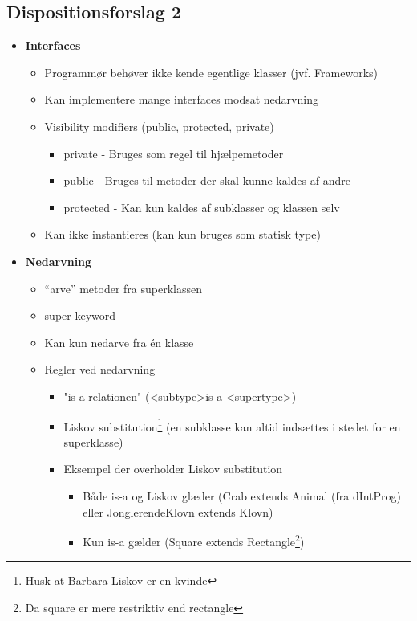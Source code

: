 \subsection{Dispositionsforslag 2}

\begin{itemize}
    \item \textbf{Interfaces}
    \begin{itemize}
        \item Programmør behøver ikke kende egentlige klasser (jvf. Frameworks)
        \item Kan implementere mange interfaces modsat nedarvning
        \item Visibility modifiers (public, protected, private)
        \begin{itemize}
            \item private - Bruges som regel til hjælpemetoder
            \item public - Bruges til metoder der skal kunne kaldes af andre
            \item protected - Kan kun kaldes af subklasser og klassen selv
        \end{itemize}

        \item Kan ikke instantieres (kan kun bruges som statisk type)
    \end{itemize}
    
    \item \textbf{Nedarvning}
    \begin{itemize}
        \item “arve” metoder fra superklassen
        \item super keyword
        \item Kan kun nedarve fra én klasse
        \item Regler ved nedarvning
        \begin{itemize}
            \item "is-a relationen" (\textless subtype\textgreater is a \textless supertype\textgreater)
            \item Liskov substitution\footnote{Husk at Barbara Liskov er en kvinde} (en subklasse kan altid indsættes i stedet for en superklasse)
            \item Eksempel der overholder Liskov substitution
            \begin{itemize}
                \item Både is-a og Liskov glæder (Crab extends Animal (fra dIntProg) eller JonglerendeKlovn extends Klovn)
                \item Kun is-a gælder (Square extends Rectangle\footnote{Da square er mere restriktiv end rectangle})
            \end{itemize}
            

\end{itemize}
\end{itemize}
\end{itemize}
